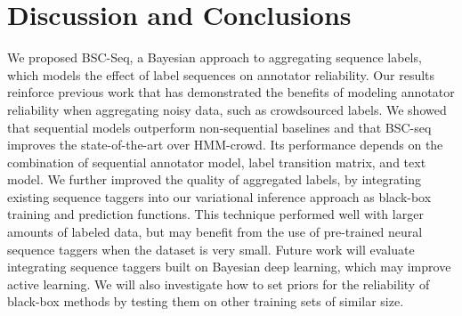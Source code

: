 \section{Discussion and Conclusions}

We proposed BSC-Seq, a Bayesian approach to aggregating sequence labels, 
which models the effect of label sequences on annotator reliability.
Our results reinforce previous work that has demonstrated the benefits of modeling annotator reliability when aggregating noisy data, such as crowdsourced labels. 
We showed that sequential models outperform non-sequential baselines
and that 
BSC-seq improves the state-of-the-art over HMM-crowd.
Its performance depends on the combination of sequential annotator model, label transition matrix, and 
text model. 
We further improved the quality of aggregated labels,
by integrating existing 
sequence taggers into our variational inference approach as black-box training and prediction functions.
This technique performed well with larger amounts of labeled data, but may benefit from the use of pre-trained neural sequence taggers
when the dataset is very small.
Future work will evaluate integrating sequence taggers built on
Bayesian deep learning, 
which may improve active learning.
We will also investigate
how to set priors for %
the reliability of black-box methods by testing them
on other training sets of similar size.


